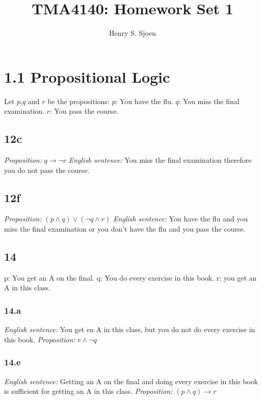 \documentclass[12pt]{article}
\author{Henry S. Sjoen}
\title{TMA4140: Homework Set 1}
\begin{document}
    \maketitle
    \tableofcontents
\title{}
    \section{1.1 Propositional Logic}
    Let $p$,$q$ and $r$ be the propositions:\newline
    $p$: You have the flu.\newline
    $q$: You miss the final examination.\newline
    $r$: You pass the course.
    \subsection{12c}
    \emph{Proposition:} $q\rightarrow \neg r$ \newline
    \emph{English sentence:} You miss the final examination therefore you do not pass the course.
\subsection{12f}
\emph{Proposition:} $ (p \wedge q) \vee (\neg q \wedge r) $ \newline
\emph{English sentence:} You have the flu and you miss the final examination or you don't have the flu and you pass the course.
\subsection{14}
p: You get an A on the final. \newline
q: You do every exercise in this book. \newline
r: you get an A in this class.

\subsubsection{14.a}
\emph{English sentence:} You get en A in this class, but you do not do every exercise in this book.\newline
\emph{Proposition:} $r \wedge \neg q$

\subsubsection{14.e}
\emph{English sentence:} Getting an A on the final and doing every exercise in this book is sufficient for getting an A in this class.\newline
\emph{Proposition:} $(p \wedge q) \rightarrow r$
\end{document}
